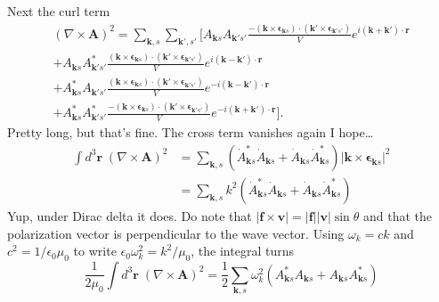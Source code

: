 \documentclass[../../../main.tex]{subfiles}
\begin{document}
Next the curl term
\begin{multline*}
  (\nabla \times \mathbf A)^2
  = \sum_{\mathbf k,s} \sum_{\mathbf k',s'} \bigg[
    A_{\mathbf k s} A_{\mathbf k' s'} \frac{-(\mathbf k \times \boldsymbol\epsilon_{\mathbf k s}) \cdot (\mathbf k' \times \boldsymbol\epsilon_{\mathbf k' s'})}{V} e^{i (\mathbf k + \mathbf k') \cdot \mathbf r}\\
    + A_{\mathbf k s} A_{\mathbf k' s'}^* \frac{(\mathbf k \times \boldsymbol\epsilon_{\mathbf k s}) \cdot (\mathbf k' \times \boldsymbol\epsilon_{\mathbf k' s'})}{V} e^{i (\mathbf k - \mathbf k') \cdot \mathbf r} \\
    + A_{\mathbf k s}^* A_{\mathbf k' s'} \frac{(\mathbf k \times \boldsymbol\epsilon_{\mathbf k s}) \cdot (\mathbf k' \times \boldsymbol\epsilon_{\mathbf k' s'})}{V} e^{-i (\mathbf k - \mathbf k') \cdot \mathbf r}\\
    + A_{\mathbf k s}^* A_{\mathbf k' s'}^* \frac{-(\mathbf k \times \boldsymbol\epsilon_{\mathbf k s}) \cdot (\mathbf k' \times \boldsymbol\epsilon_{\mathbf k' s'})}{V} e^{-i (\mathbf k + \mathbf k') \cdot \mathbf r}
    \bigg].
\end{multline*}
Pretty long, but that's fine.
The cross term vanishes again I hope\dots
\begin{align*}
  \int d^3 \mathbf{r}  \; (\nabla \times \mathbf A)^2
   & =  \sum_{\mathbf{k},s}  \left( \dot{A}_{\mathbf{k} s}^{*} \dot{A}_{\mathbf{k} s} + \dot{A}_{\mathbf{k} s} \dot{A}_{\mathbf{k} s}^{*} \right) |\mathbf{k }\times \boldsymbol{\epsilon}_{\mathbf{k}s} |^2 \\
   & =  \sum_{\mathbf{k},s} k^2 \left( \dot{A}_{\mathbf{k} s}^{*} \dot{A}_{\mathbf{k} s} + \dot{A}_{\mathbf{k} s} \dot{A}_{\mathbf{k} s}^{*} \right)
\end{align*}
Yup, under Dirac delta it does.
Do note that $|\mathbf{f} \times \mathbf{v}|=|\mathbf{f}| |\mathbf{v}| \sin \theta$ and that the polarization vector is perpendicular to the wave vector.
Using $\omega_k = ck$ and $c^2=1/\epsilon_0\mu_0$ to write $\epsilon_0\omega_k^2=k^2/\mu_0$, the integral turns
\begin{equation*}
  \frac{1 }{2\mu_0} \int d^3 \mathbf{r}  \; (\nabla \times \mathbf A)^2
  =\frac{1 }{2} \sum_{\mathbf{k},s}  \omega_k^2 \left( {A}_{\mathbf{k} s}^{*} A_{\mathbf{k} s} + A_{\mathbf{k} s} A_{\mathbf{k} s}^{*} \right)
\end{equation*}
\end{document}
